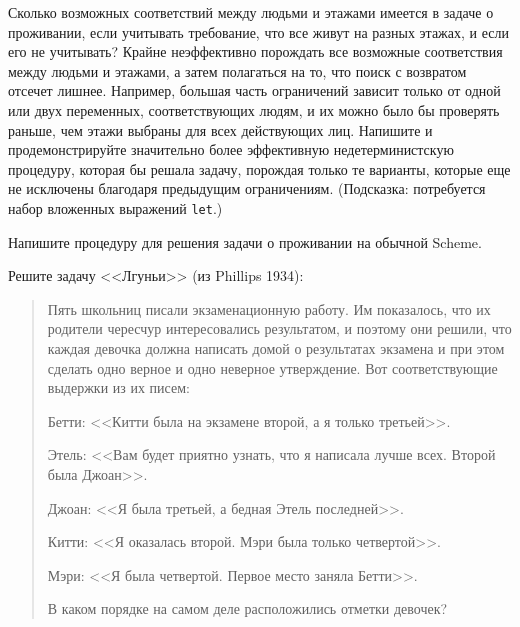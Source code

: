\begin{exercise}{4.40}%
\label{EX4.40}%
Сколько возможных соответствий между людьми и этажами
имеется в задаче о проживании, если учитывать требование, что все
живут на разных этажах, и если его не учитывать?  Крайне неэффективно
порождать все возможные соответствия между людьми и этажами, а
затем полагаться на то, что поиск с возвратом отсечет лишнее.
Например, большая часть ограничений зависит только от одной или двух
переменных, соответствующих людям, и их можно было бы проверять раньше, чем
этажи выбраны для всех действующих лиц.  Напишите и продемонстрируйте значительно
более эффективную недетерминистскую процедуру, которая бы решала задачу,
порождая только те варианты, которые еще не исключены благодаря предыдущим
ограничениям. (Подсказка: потребуется набор вложенных выражений
{\tt let}.)
\end{exercise}

\begin{exercise}{4.41}%
\label{EX4.41}%
%
Напишите процедуру для решения задачи о проживании на обычной Scheme.
\end{exercise}

\begin{exercise}{4.42}%
\label{EX4.42}%
Решите задачу <<Лгуньи>> (из Phillips 1934): %

\begin{quote}
Пять школьниц писали экзаменационную работу.  Им показалось, что их
родители чересчур интересовались результатом, и поэтому они решили, что каждая
девочка должна написать домой о результатах экзамена и при этом
сделать одно верное и одно неверное утверждение.  Вот соответствующие
выдержки из их писем:

Бетти: <<Китти была на экзамене второй, а я только третьей>>.

Этель: <<Вам будет приятно узнать, что я написала
лучше всех.  Второй была Джоан>>.

Джоан: <<Я была третьей, а бедная Этель последней>>.

Китти: <<Я оказалась второй.  Мэри была только четвертой>>.

Мэри: <<Я была четвертой. Первое место заняла Бетти>>.

В каком порядке на самом деле расположились отметки девочек?
\end{quote}
\end{exercise}

